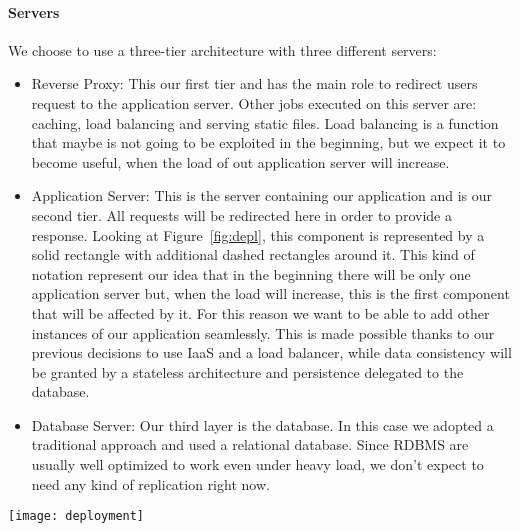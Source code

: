 \paragraph{Servers} We choose to use a three-tier architecture with three different servers:
\begin{itemize}
    \item{Reverse Proxy}: This our first tier and has the main role to redirect users request to
        the application server. Other jobs executed on this server are: caching, load balancing
        and serving static files.
        Load balancing is a function that maybe is not going to be exploited in the beginning,
        but we expect it to become useful, when the load of out application server will increase.

    \item{Application Server}: This is the server containing our application and is our second tier.
        All requests will be redirected here in order to provide a response. Looking at
        Figure~\ref{fig:depl}, this component is represented by a solid rectangle with additional
        dashed rectangles around it. This kind of notation represent our idea that in the
        beginning there will be only one application server but, when the load will increase,
        this is the first component that will be affected by it. For this reason we want to
        be able to add other instances of our application seamlessly. This is made possible
        thanks to our previous decisions to use IaaS and a load balancer, while data consistency
        will be granted by a stateless architecture and persistence delegated to the database.

    \item{Database Server}: Our third layer is the database. In this case we adopted a
        traditional approach and used a relational database. Since RDBMS are usually well
        optimized to work even under heavy load, we don't expect to need any kind of
        replication right now.

\end{itemize}
\begin{sidewaysfigure}
\centering
\texttt{[image: deployment]}
\caption{Deployment view}
\label{fig:depl}
\end{sidewaysfigure}
